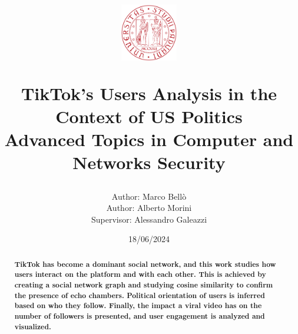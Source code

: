 \documentclass[twocolumn]{article}
\title{
    \vspace{-1cm}
    \includegraphics[height=2.5cm]{images/logo_unipd.png}
    \par
    \vspace{0.5cm}
    \textbf{TikTok's Users Analysis in the Context of US Politics}\\
    Advanced Topics in Computer and Networks Security
}
\author{
    Author: {Marco Bellò} \\
    Author: {Alberto Morini} \\
    Supervisor: {Alessandro Galeazzi}
}
\date{18/06/2024}
\begin{document}
\maketitle


%
%
%
%
%
\begin{abstract}
    \textbf{TikTok has become a dominant social network, and this work studies how users interact on the platform and with each other. This is achieved by creating a social network graph and studying cosine similarity to confirm the presence of echo chambers. Political orientation of users is inferred based on who they follow. Finally, the impact a viral video has on the number of followers is presented, and user engagement is analyzed and visualized.
    }
\end{abstract}











\end{document}
